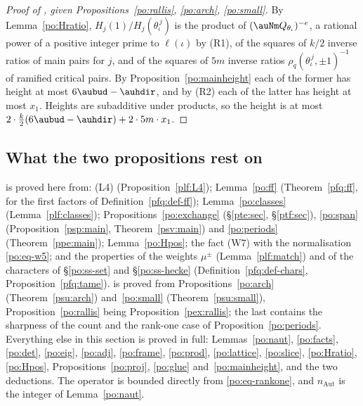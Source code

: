 \documentclass[10pt]{amsart}
\theoremstyle{definition}
\theoremstyle{remark}
\begin{document}
\begin{proof}[Proof of {\cite[Proposition~14.42]{P46}}, given Propositions~\ref{po:rallis}, \ref{po:arch},
\ref{po:small}]
By Lemma~\ref{po:Hratio}, $H_j(1)/H_j(\theta_\iota^{\,j})$ is the product of $(\auNm
Q_{\theta_\iota})^{-e}$, a rational power of a positive integer prime to $\ell(\iota)$ by (R1),
of the squares of $k/2$ inverse ratios of main pairs for $j$, and of the squares of $5m$ inverse
ratios $\rho_q(\theta_\iota^{\,j},\pm1)^{-1}$ of ramified critical pairs. By
Proposition~\ref{po:mainheight} each of the former has height at most $6\aubud-\auhdir$, and by
(R2) each of the latter has height at most $x_1$. Heights are subadditive under products, so the
height is at most $2\cdot\tfrac k2(6\aubud-\auhdir)+2\cdot5m\cdot x_1$.
\end{proof}

\subsection{What the two propositions rest on}\label{po:ss-rest}

{\cite[Proposition~14.41]{P46}} is proved here from: (L4) (Proposition~\ref{plf:L4}); Lemma~\ref{po:ff}
(Theorem~\ref{pfq:ff}, for the first factors of Definition~\ref{pfq:def-ff}); Lemma~\ref{po:classes} (Lemma~\ref{plf:classes}); Propositions~\ref{po:exchange}
(\S\ref{pte:sec}, \S\ref{ptf:sec}), \ref{po:span} (Proposition~\ref{psp:main}, Theorem~\ref{psv:main}) and
\ref{po:periods} (Theorem~\ref{ppe:main}); Lemma~\ref{po:Hpos}; the fact (W7) with the normalisation
\eqref{po:eq-w5}; and the properties of the weights $\mu^\pm$ (Lemma~\ref{plf:match}) and of the characters of
\S\ref{po:ss-set} and \S\ref{po:ss-hecke} (Definition~\ref{pfq:def-chars}, Proposition~\ref{pfq:tame}). {\cite[Proposition~14.42]{P46}} is proved from Propositions~\ref{po:arch}
(Theorem~\ref{psu:arch}) and~\ref{po:small} (Theorem~\ref{psu:small}), Proposition~\ref{po:rallis} being
Proposition~\ref{pex:rallis}; the last contains the sharpness of the count and the rank-one case of
Proposition~\ref{po:periods}. Everything else in this section is proved in full:
Lemmas~\ref{po:naut}, \ref{po:facts}, \ref{po:det}, \ref{po:eig}, \ref{po:adj}, \ref{po:frame},
\ref{po:prod}, \ref{po:lattice}, \ref{po:slice}, \ref{po:Hratio}, \ref{po:Hpos},
Propositions~\ref{po:proj}, \ref{po:glue} and~\ref{po:mainheight}, and the two deductions.
The operator is bounded directly from \eqref{po:eq-rankone}, and $n_{\mathrm{Aut}}$ is the integer of
Lemma~\ref{po:naut}.
\end{document}
